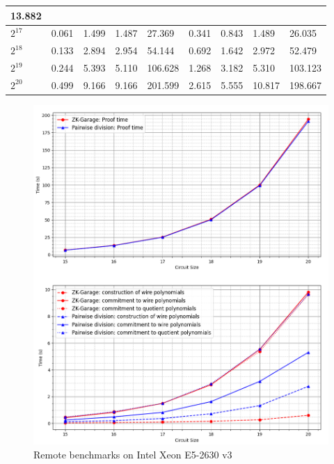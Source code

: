 \begin{table}[H]
\begin{tabular}{|l|llll|llll|}
      13.882 \\ \hline
    $2^{17}$ &
      \multicolumn{1}{l|}{0.061} &
      \multicolumn{1}{l|}{1.499} &
      \multicolumn{1}{l|}{1.487} &
      27.369 &
      \multicolumn{1}{l|}{0.341} &
      \multicolumn{1}{l|}{0.843} &
      \multicolumn{1}{l|}{1.489} &
      26.035 \\ \hline
    $2^{18}$ &
      \multicolumn{1}{l|}{0.133} &
      \multicolumn{1}{l|}{2.894} &
      \multicolumn{1}{l|}{2.954} &
      54.144 &
      \multicolumn{1}{l|}{0.692} &
      \multicolumn{1}{l|}{1.642} &
      \multicolumn{1}{l|}{2.972} &
      52.479 \\ \hline
    $2^{19}$ &
      \multicolumn{1}{l|}{0.244} &
      \multicolumn{1}{l|}{5.393} &
      \multicolumn{1}{l|}{5.110} &
      106.628 &
      \multicolumn{1}{l|}{1.268} &
      \multicolumn{1}{l|}{3.182} &
      \multicolumn{1}{l|}{5.310} &
      103.123 \\ \hline
    $2^{20}$ &
      \multicolumn{1}{l|}{0.499} &
      \multicolumn{1}{l|}{9.166} &
      \multicolumn{1}{l|}{9.166} &
      201.599 &
      \multicolumn{1}{l|}{2.615} &
      \multicolumn{1}{l|}{5.555} &
      \multicolumn{1}{l|}{10.817} &
      198.667 \\ \hline
    \end{tabular}
\end{table}

\begin{figure}
    \centering
    \label{fig:kam-bench}
    \includegraphics[width=1\linewidth]{figures/optimizations/kam_bench.png}
    \caption{Remote benchmarks on Intel Xeon E5-2630 v3}
\end{figure}


